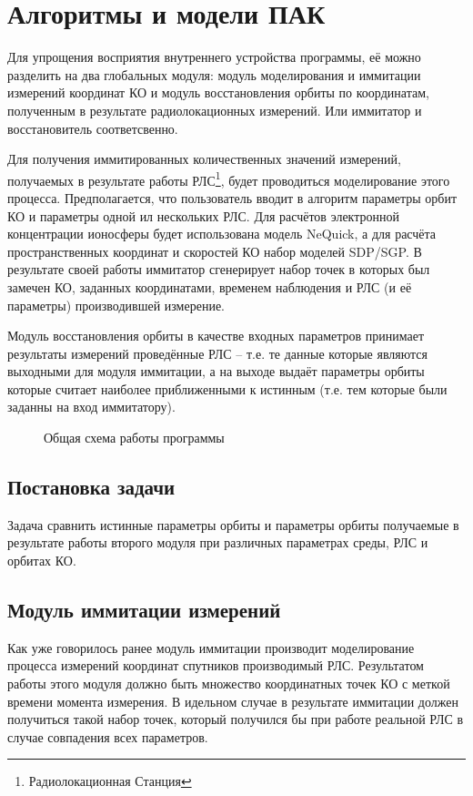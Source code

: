 \chapter{Алгоритмы и модели ПАК}

Для упрощения восприятия внутреннего устройства программы, её можно разделить на два глобальных модуля: модуль
моделирования и иммитации измерений координат КО и модуль восстановления орбиты по координатам, полученным в
результате радиолокационных измерений. Или иммитатор и восстановитель соответсвенно.

Для получения иммитированных количественных значений измерений, получаемых в результате работы 
РЛС\footnote{Радиолокационная Станция}, будет проводиться моделирование этого процесса. Предполагается, что
пользователь вводит в алгоритм параметры орбит КО и параметры одной ил нескольких РЛС. Для расчётов электронной
концентрации ионосферы будет использована модель NeQuick\cite{NeQuick}, а для расчёта пространственных координат и
скоростей КО набор моделей SDP/SGP\cite{Norad}. В результате своей работы иммитатор сгенерирует набор точек в которых 
был замечен КО, заданных координатами, временем наблюдения и РЛС (и её параметры) производившей измерение.

Модуль восстановления орбиты в качестве входных параметров принимает результаты измерений проведённые РЛС 
-- т.е. те данные которые являются выходными для модуля иммитации, а на выходе выдаёт параметры орбиты которые 
считает наиболее приближенными к истинным (т.е. тем которые были заданны на вход иммитатору).

\begin{figure}[h]
	\centering
	
	\caption{Общая схема работы программы}
\end{figure}

\section{Постановка задачи}

Задача сравнить истинные параметры орбиты и параметры орбиты получаемые в результате работы второго модуля при 
различных параметрах среды, РЛС и орбитах КО.


\section{Модуль иммитации измерений}

Как уже говорилось ранее модуль иммитации производит моделирование процесса измерений координат спутников 
производимый РЛС. Результатом работы этого модуля должно быть множество координатных точек КО с меткой времени момента 
измерения. В идельном случае в результате иммитации должен получиться такой набор точек, который получился бы при 
работе реальной РЛС в случае совпадения всех параметров.

